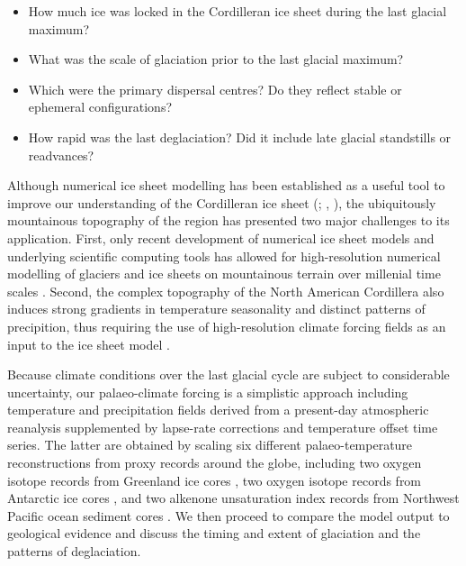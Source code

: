 \documentclass[tc]{copernicus}
\begin{document}
\begin{itemize}
  \item How much ice was locked in the Cordilleran ice sheet during the
    last glacial maximum?
  \item What was the scale of glaciation prior to the last glacial maximum?
  \item Which were the primary dispersal centres? Do they reflect stable or
    ephemeral configurations?
  \item How rapid was the last deglaciation? Did it include late glacial
    standstills or readvances?
\end{itemize}

Although numerical ice sheet modelling has been established as a useful tool to
improve our understanding of the Cordilleran ice sheet
    (\citealp[p.~227]{Jackson.Clague.1991}; \citealp{Robert.1991},
     \citealp{Marshall.etal.2000}),
the ubiquitously mountainous
topography of the region has presented two major challenges to its application.
First, only recent development of numerical ice sheet models and underlying
scientific computing tools \citep{Bueler.Brown.2009, Balay.etal.2014} has
allowed for high-resolution numerical modelling of glaciers and ice sheets on
mountainous terrain
over millenial time scales \citep[e.g.,][]{Golledge.etal.2012}. Second, the
complex
topography of the North American Cordillera also induces strong gradients in
temperature
seasonality and distinct patterns of precipition, thus requiring the use of
high-resolution climate forcing fields as an input to the ice sheet model
\citep{Seguinot.etal.2014}.

Because climate conditions over the last glacial cycle are subject to
considerable uncertainty, our palaeo-climate forcing is a simplistic approach
including temperature and precipitation fields derived from a
present-day atmospheric reanalysis \citep{Mesinger.etal.2006,
Seguinot.etal.2014} supplemented by lapse-rate corrections
and temperature offset time series. The latter are obtained by scaling six
different palaeo-temperature reconstructions from proxy records around the
globe, including two oxygen isotope records from Greenland ice cores
\citep{Dansgaard.etal.1993, Andersen.etal.2004}, two oxygen isotope
records from Antarctic ice cores \citep{Petit.etal.1999,Jouzel.etal.2007},
and two alkenone unsaturation index records from Northwest Pacific ocean
sediment cores \citep{Herbert.etal.2001}. We then proceed to compare the model
output to geological evidence and discuss the timing and extent of glaciation
and the patterns of deglaciation.
\end{document}
